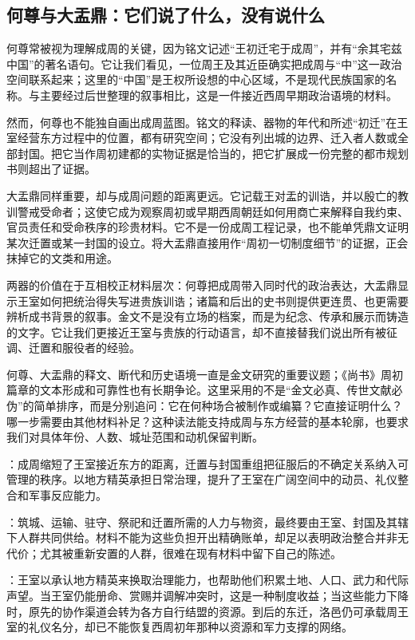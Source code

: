 \subsection{何尊与大盂鼎：它们说了什么，没有说什么}

何尊常被视为理解成周的关键，因为铭文记述“王初迁宅于成周”，并有“余其宅兹中国”的著名语句。它让我们看见，一位周王及其近臣确实把成周与“中”这一政治空间联系起来；这里的“中国”是王权所设想的中心区域，不是现代民族国家的名称。与主要经过后世整理的叙事相比，这是一件接近西周早期政治语境的材料。

然而，何尊也不能独自画出成周蓝图。铭文的释读、器物的年代和所述“初迁”在王室经营东方过程中的位置，都有研究空间；它没有列出城的边界、迁入者人数或全部封国。把它当作周初建都的实物证据是恰当的，把它扩展成一份完整的都市规划书则超出了证据。

大盂鼎同样重要，却与成周问题的距离更远。它记载王对盂的训诰，并以殷亡的教训警戒受命者；这使它成为观察周初或早期西周朝廷如何用商亡来解释自我约束、官员责任和受命秩序的珍贵材料。它不是一份成周工程记录，也不能单凭鼎文证明某次迁置或某一封国的设立。将大盂鼎直接用作“周初一切制度细节”的证据，正会抹掉它的文类和用途。

两器的价值在于互相校正材料层次：何尊把成周带入同时代的政治表达，大盂鼎显示王室如何把统治得失写进贵族训诰；诸篇和后出的史书则提供更连贯、也更需要辨析成书背景的叙事。金文不是没有立场的档案，而是为纪念、传承和展示而铸造的文字。它让我们更接近王室与贵族的行动语言，却不直接替我们说出所有被征调、迁置和服役者的经验。

\begin{sourcenote}
何尊、大盂鼎的释文、断代和历史语境一直是金文研究的重要议题；《尚书》周初篇章的文本形成和可靠性也有长期争论。这里采用的不是“金文必真、传世文献必伪”的简单排序，而是分别追问：它在何种场合被制作或编纂？它直接证明什么？哪一步需要由其他材料补足？这种读法能支持成周与东方经营的基本轮廓，也要求我们对具体年份、人数、城址范围和动机保留判断。
\end{sourcenote}

\begin{turningpoint}
：成周缩短了王室接近东方的距离，迁置与封国重组把征服后的不确定关系纳入可管理的秩序。以地方精英承担日常治理，提升了王室在广阔空间中的动员、礼仪整合和军事反应能力。

：筑城、运输、驻守、祭祀和迁置所需的人力与物资，最终要由王室、封国及其辖下人群共同供给。材料不能为这些负担开出精确账单，却足以表明政治整合并非无代价；尤其被重新安置的人群，很难在现有材料中留下自己的陈述。

：王室以承认地方精英来换取治理能力，也帮助他们积累土地、人口、武力和代际声望。当王室仍能册命、赏赐并调解冲突时，这是一种制度收益；当这些能力下降时，原先的协作渠道会转为各方自行结盟的资源。到后的东迁，洛邑仍可承载周王室的礼仪名分，却已不能恢复西周初年那种以资源和军力支撑的网络。
\end{turningpoint}
